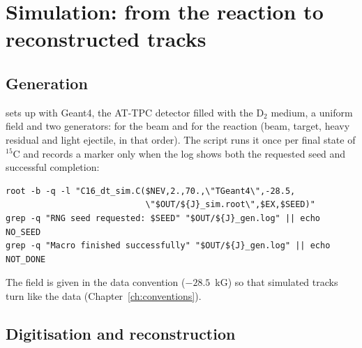 \section{Simulation: from the reaction to reconstructed tracks}

\subsection{Generation}

 sets up  with Geant4, the AT-TPC detector filled with the D$_2$ medium, a
uniform field and two generators:  for the beam and  for the reaction (beam,
target, heavy residual and light ejectile, in that order). The script  runs it once per
final state of $^{15}$C and records a marker only when the log shows both the requested seed and successful
completion:
\begin{verbatim}
root -b -q -l "C16_dt_sim.C($NEV,2.,70.,\"TGeant4\",-28.5,
                            \"$OUT/${J}_sim.root\",$EX,$SEED)"
grep -q "RNG seed requested: $SEED" "$OUT/${J}_gen.log" || echo NO_SEED
grep -q "Macro finished successfully" "$OUT/${J}_gen.log" || echo NOT_DONE
\end{verbatim}
The field is given in the data convention ($-28.5$~kG) so that simulated tracks turn like the data
(Chapter~\ref{ch:conventions}).

\subsection{Digitisation and reconstruction}

